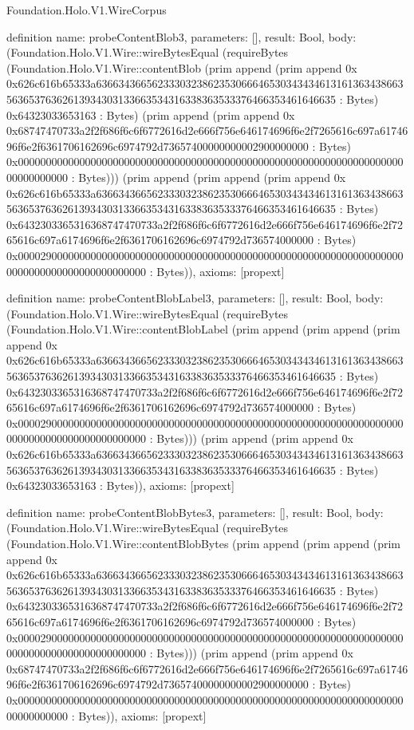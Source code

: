 \begin{lexlean}{Foundation.Holo.V1.WireCorpus}
\begin{semanticmodule}
definition{
  name: probeContentBlob3,
  parameters: [],
  result: Bool,
  body: (Foundation.Holo.V1.Wire::wireBytesEqual (requireBytes (Foundation.Holo.V1.Wire::contentBlob (prim append (prim append 0x 0x626c616b65333a636634366562333032386235306664653034343461316136343866356365376362613934303133663534316338363533376466353461646635 : Bytes) 0x64323033653163 : Bytes) (prim append (prim append 0x 0x68747470733a2f2f686f6c6f6772616d2e666f756e646174696f6e2f7265616c697a6174696f6e2f6361706162696c6974792d73657400000000002900000000 : Bytes) 0x00000000000000000000000000000000000000000000000000000000000000000000000000000000 : Bytes))) (prim append (prim append (prim append 0x 0x626c616b65333a636634366562333032386235306664653034343461316136343866356365376362613934303133663534316338363533376466353461646635 : Bytes) 0x6432303365316368747470733a2f2f686f6c6f6772616d2e666f756e646174696f6e2f7265616c697a6174696f6e2f6361706162696c6974792d736574000000 : Bytes) 0x0000290000000000000000000000000000000000000000000000000000000000000000000000000000000000000000 : Bytes)),
  axioms: [propext]
}

definition{
  name: probeContentBlobLabel3,
  parameters: [],
  result: Bool,
  body: (Foundation.Holo.V1.Wire::wireBytesEqual (requireBytes (Foundation.Holo.V1.Wire::contentBlobLabel (prim append (prim append (prim append 0x 0x626c616b65333a636634366562333032386235306664653034343461316136343866356365376362613934303133663534316338363533376466353461646635 : Bytes) 0x6432303365316368747470733a2f2f686f6c6f6772616d2e666f756e646174696f6e2f7265616c697a6174696f6e2f6361706162696c6974792d736574000000 : Bytes) 0x0000290000000000000000000000000000000000000000000000000000000000000000000000000000000000000000 : Bytes))) (prim append (prim append 0x 0x626c616b65333a636634366562333032386235306664653034343461316136343866356365376362613934303133663534316338363533376466353461646635 : Bytes) 0x64323033653163 : Bytes)),
  axioms: [propext]
}

definition{
  name: probeContentBlobBytes3,
  parameters: [],
  result: Bool,
  body: (Foundation.Holo.V1.Wire::wireBytesEqual (requireBytes (Foundation.Holo.V1.Wire::contentBlobBytes (prim append (prim append (prim append 0x 0x626c616b65333a636634366562333032386235306664653034343461316136343866356365376362613934303133663534316338363533376466353461646635 : Bytes) 0x6432303365316368747470733a2f2f686f6c6f6772616d2e666f756e646174696f6e2f7265616c697a6174696f6e2f6361706162696c6974792d736574000000 : Bytes) 0x0000290000000000000000000000000000000000000000000000000000000000000000000000000000000000000000 : Bytes))) (prim append (prim append 0x 0x68747470733a2f2f686f6c6f6772616d2e666f756e646174696f6e2f7265616c697a6174696f6e2f6361706162696c6974792d73657400000000002900000000 : Bytes) 0x00000000000000000000000000000000000000000000000000000000000000000000000000000000 : Bytes)),
  axioms: [propext]
}


\end{semanticmodule}
\end{lexlean}
